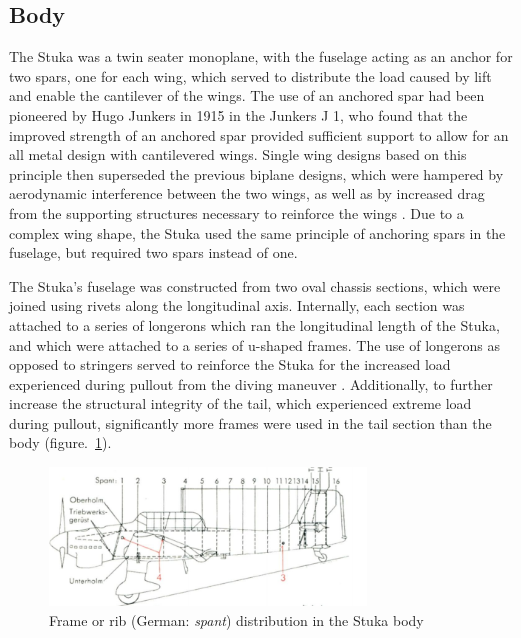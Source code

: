 \documentclass[a4paper, fontsize=11pt]{scrartcl} %
\begin{document}
\subsection{Body}
The Stuka was a twin seater monoplane, with the fuselage acting as an
anchor for two spars, one for each wing, which served to distribute the
load caused by lift and enable the cantilever of the wings.
The use of an anchored spar had been pioneered by Hugo Junkers in 1915
\autocite{nasa4} in the Junkers J 1, who found that the improved
strength of an anchored spar provided sufficient support to allow for an
all metal design with cantilevered wings. Single wing designs based on
this principle then superseded the previous biplane designs, which were
hampered by aerodynamic interference between the two wings, as well as
by increased drag from the supporting structures necessary to reinforce
the wings \autocite[p~.37]{peery12}. Due to a complex wing shape, the
Stuka used the same principle of anchoring spars in the fuselage, but
required two spars instead of one.

The Stuka's fuselage was constructed from two oval
chassis sections, which were joined using rivets along the longitudinal
axis.  Internally, each section was attached to a series of longerons
which ran the longitudinal length of the Stuka, and which were attached
to a series of u-shaped frames. The use of longerons as opposed to
stringers served to reinforce the Stuka for the increased load
experienced during pullout from the diving maneuver \autocite{peery12}.
Additionally, to further increase the structural integrity of the tail, which
experienced extreme load during pullout, significantly more frames were
used in the tail section than the body (figure.~\ref{fig:ribs}).
\begin{figure}[h]
  \centering
  \includegraphics[width=0.75\textwidth]{media/ribbing}
  \caption{Frame or rib (German: \textit{spant}) distribution in the Stuka body \autocite{manual39}}
  \label{fig:ribs}
\end{figure}
\end{document}
